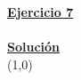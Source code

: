 \indent\underline{\textbf{Ejercicio 7}}\\
\lipsum[4]\\

\indent\underline{\textbf{Solución}}\\

\line(1,0){\textwidth}
